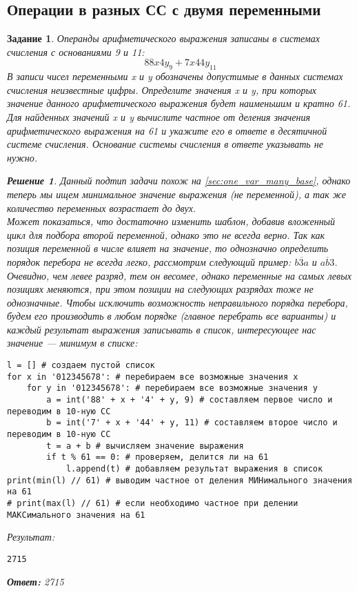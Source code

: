 \documentclass[12pt]{article}
\theoremstyle{problem_style}
\newtheorem{problem}{Задание}[subsection]
\newtheorem{solution}{Решение}[subsection]
\begin{document}
\subsection{Операции в разных СС с двумя переменными}\label{sec:two_var_many_base}
\begin{problem}
Операнды арифметического выражения записаны в системах счисления с основаниями 9 и 11:
\[
88x4y_9 + 7x44y_{11}
\]
В записи чисел переменными x и y обозначены допустимые в данных системах счисления неизвестные цифры. Определите значения x и y, при которых значение данного арифметического выражения будет наименьшим и кратно 61. Для найденных значений x и y вычислите частное от деления значения арифметического выражения на 61 и укажите его в ответе в десятичной системе счисления. Основание системы счисления в ответе указывать не нужно.
\begin{solution}
Данный подтип задачи похож на \autoref{sec:one_var_many_base}, однако теперь мы ищем минимальное значение выражения (не переменной), а так же количество переменных возрастает до двух.\\
Может показаться, что достаточно изменить шаблон, добавив вложенный цикл для подбора второй переменной, однако это не всегда верно. Так как позиция переменной в числе влияет на значение, то однозначно определить порядок перебора не всегда легко, рассмотрим следующий пример: $\overline{b3a}$ и $\overline{ab3}$. Очевидно, чем левее разряд, тем он весомее, однако переменные на самых левых позициях меняются, при этом позиции на следующих разрядах тоже не однозначные. Чтобы исключить возможность неправильного порядка перебора, будем его производить в любом порядке (главное перебрать все варианты) и каждый результат выражения записывать в список, интересующее нас значение — минимум в списке:
\begin{verbatim}
l = [] # создаем пустой список
for x in '012345678': # перебираем все возможные значения x
    for y in '012345678': # перебираем все возможные значения y
        a = int('88' + x + '4' + y, 9) # составляем первое число и переводим в 10-ную СС
        b = int('7' + x + '44' + y, 11) # составляем второе число и переводим в 10-ную СС
        t = a + b # вычисляем значение выражения
        if t % 61 == 0: # проверяем, делится ли на 61
            l.append(t) # добавляем результат выражения в список
print(min(l) // 61) # выводим частное от деления МИНимального значения на 61
# print(max(l) // 61) # если необходимо частное при делении МАКСимального значения на 61
\end{verbatim}
Результат:
\begin{verbatim}
2715
\end{verbatim}
\textbf{Ответ:} 2715
\end{solution}
\end{problem}
\end{document}
